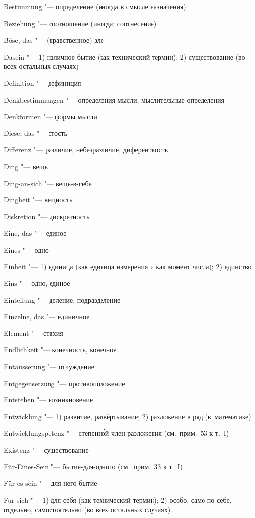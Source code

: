 \begin{multicols}{2}
Bestimmung "--- определение (иногда в смысле назначения)

Beziehung "--- соотношение (иногда: соотнесение)

Böse, das "--- (нравственное) зло

\bigskip

Dasein "--- 1) наличное бытие (как технический термин); 2)
существование (во всех остальных случаях)

Definition "--- дефиниция

Denk\-bestim\-mun\-gen "--- определения мысли, мыслительные определения

Denkformen "--- формы мысли

Diese, das "--- этость

Differenz "--- различие, небезразличие, диферентность

Ding "--- вещь

Ding-an-sich "--- вещь-в-себе

Dingheit "--- вещность

Diskretion "--- дискретность

\bigskip

Eine, das "--- единое

Eines "--- одно

Einheit "--- 1) единица (как единица измерения и как момент числа); 2) единство

Eins "--- одно, единое

Einteilung "--- деление, подразделение

Einzelne, das "--- единичное

Element "--- стихия

Endlichkeit "--- конечность, конечное

Entäus\-serung "--- отчуждение

Entgegen\-setzung "--- противоположение

Entstehen "--- возникновение

Entwicklung "--- 1) развитие, развёртывание; 2) разложение в ряд (в~математике)

Ent\-wick\-lungs\-po\-tenz "--- степенн\'{о}й член разложения
(см.~прим.~53 к т.~I)

Existenz "--- существование

\bigskip

Für-Eines-Sein "--- бытие-для-одного (см.~прим.~33 к т.~I)

Für-es-sein "--- для-него-бытие

Fur-sich "--- 1) для себя (как технический термин); 2) особо,
само по себе, отдельно, самостоятельно (во всех остальных случаях)


\end{multicols}
